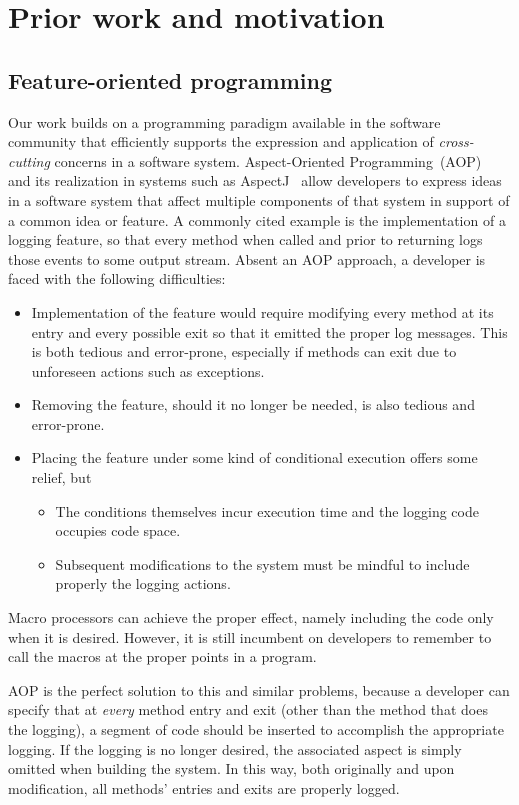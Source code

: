 \documentclass[sigplan,anonymous,review]{acmart}
\begin{document}
\section{Prior work and motivation}\label{sec:prior}

\subsection{Feature-oriented programming}\label{sec:priorfop}

Our work builds on a programming paradigm available in the software community that efficiently supports the expression and application of \emph{cross-cutting} concerns in a software system.  Aspect-Oriented Programming~(AOP)~\cite{Kicz97} and its realization in systems such as AspectJ~\cite{aspectj} allow developers to express ideas in a software system that affect multiple components of that system in support of a common idea or feature. A commonly cited example is the implementation of a logging feature, so that every method when called and prior to returning logs those events to some output stream. Absent an AOP approach, a developer is faced with the following difficulties:
\begin{itemize}
    \item Implementation of the feature would require modifying every method at its entry and every possible exit so that it emitted the proper log messages.  This is both tedious and error-prone, especially if methods can exit due to unforeseen actions such as exceptions.
    \item Removing the feature, should it no longer be needed, is also tedious and error-prone.
    \item Placing the feature under some kind of conditional execution offers some relief, but
    \begin{itemize}
        \item The conditions themselves incur execution time and the logging code occupies code space.
        \item Subsequent modifications to the system must be mindful to include properly the logging actions.
    \end{itemize}
\end{itemize}
Macro processors can achieve the proper effect, namely including the code only when it is desired.  However, it is still incumbent on developers to remember to call the macros at the proper points in a program.

AOP is the perfect solution to this and similar problems, because a developer can specify that at \emph{every} method entry and exit (other than the method that does the logging), a segment of code should be inserted to accomplish the appropriate logging.  If the logging is no longer desired, the associated aspect is simply omitted when building the system.  In this way, both originally and upon modification, all methods' entries and exits are properly logged.
\end{document}
